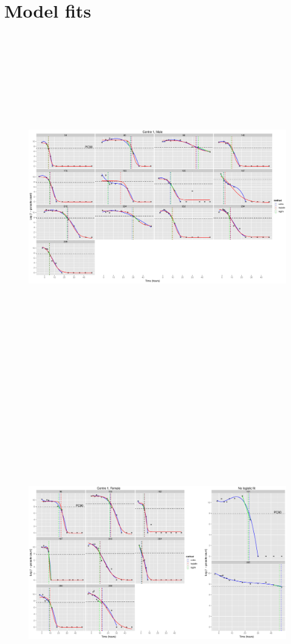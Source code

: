 \section{Model fits}
\begin{figure}
\includegraphics[height=150mm]{Afits1M.eps}
\end{figure}
\begin{figure}
\includegraphics[height=150mm]{Afits1F.eps}
\end{figure}
